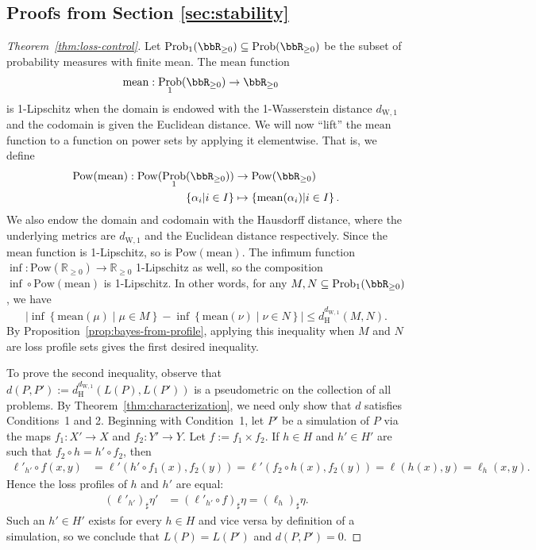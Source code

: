 \documentclass[twoside,11pt]{article}
\DeclareMathOperator{\prob}{Prob}
\newcommand{\set}[2]{\left\{ #1\middle| #2\right\}}
\newcommand{\dWp}[1]{d_{\mathrm{W},#1}}
\newcommand{\dW}{\dWp 1}
\newcommand{\dH}{d_\mathrm{H}}
\newcommand{\pow}{\mathrm{Pow}}%
\begin{document}
\subsection{Proofs from Section \ref{sec:stability}}
\begin{proof}[Theorem~\ref{thm:loss-control}]
    Let $\prob_1(\bbR_{\geq 0})\subseteq \prob(\bbR_{\geq 0})$ be the subset of probability measures with finite mean. The $\mathrm{mean}$ function
    \begin{align*}
    \mathrm{mean}:\prob_1(\bbR_{\geq 0}) &\to \bbR_{\geq 0}
    \end{align*}
    is 1-Lipschitz when the domain is endowed with the 1-Wasserstein distance $\dWp{1}$ and the codomain is given the Euclidean distance. We will now ``lift'' the $\mathrm{mean}$ function to a function on power sets by applying it elementwise. That is, we define
    \begin{align*}
        \pow(\mathrm{mean}): \pow(\prob_1(\bbR_{\geq 0})) &\to \pow(\bbR_{\geq 0}) \\
        \set{\alpha_i}{i\in I} &\mapsto \set{\mathrm{mean}(\alpha_i)}{i\in I}.
    \end{align*}
    We also endow the domain and codomain with the Hausdorff distance, where the underlying metrics are $\dWp{1}$ and the Euclidean distance respectively. Since the $\mathrm{mean}$ function is 1-Lipschitz, so is $\pow(\mathrm{mean})$. The infimum function $\inf:\pow(\mathbb R_{\geq 0}) \to \mathbb R_{\geq 0}$ 1-Lipschitz as well, so the composition $\inf \circ \pow(\mathrm{mean})$ is 1-Lipschitz. In other words, for any $M,N \subseteq \prob_1(\bbR_{\geq 0})$, we have
    \[
    \big| \inf\set{\mathrm{mean}(\mu)}{\mu \in M} - \inf\set{\mathrm{mean}(\nu)}{\nu\in N} \big| \leq \dH^{\dWp{1}}(M,N).
    \]
    By Proposition~\ref{prop:bayes-from-profile}, applying this inequality when $M$ and $N$ are loss profile sets gives the first desired inequality.

    To prove the second inequality, observe that $d(P,P') := \dH^{\dW}(L(P),L(P'))$ is a pseudometric on the collection of all problems. By Theorem~\ref{thm:characterization}, we need only show that $d$ satisfies Conditions~1 and 2. Beginning with Condition~1, let $P'$ be a simulation of $P$ via the maps $f_1:X' \to X$ and $f_2:Y' \to Y$. Let $f:= f_1\times f_2$. If $h\in H$ and $h'\in H'$ are such that $f_2\circ h = h' \circ f_2$, then
    \begin{align*}
        \ell'_{h'} \circ f(x,y) & = \ell'(h'\circ f_1(x), f_2(y)) = \ell'(f_2\circ h(x), f_2(y)) = \ell(h(x),y) = \ell_h(x,y).
    \end{align*}
    Hence the loss profiles of $h$ and $h'$ are equal:
    \begin{align*}
        (\ell'_{h'})_\sharp \eta' & = (\ell'_{h'} \circ f)_\sharp \eta = (\ell_h)_\sharp \eta.
    \end{align*}
    Such an $h' \in H'$ exists for every $h\in H$ and vice versa by definition of a simulation, so we conclude that $L(P) = L(P')$ and $d(P,P') = 0$.


\end{proof}
\end{document}
